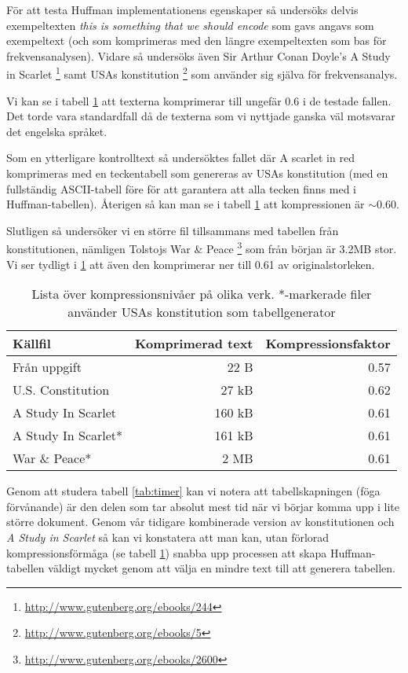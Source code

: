 \documentclass[a4paper, 11pt]{article}
\begin{document}
För att testa Huffman implementationens egenskaper så undersöks delvis exempeltexten \textit{this is something that we should encode} som gavs angavs som exempeltext (och som komprimeras med den längre exempeltexten som bas för frekvensanalysen). Vidare så undersöks även Sir Arthur Conan Doyle's A Study in Scarlet \footnote{\url{http://www.gutenberg.org/ebooks/244}} samt USAs konstitution \footnote{\url{http://www.gutenberg.org/ebooks/5}} som använder sig själva för frekvensanalys. 

Vi kan se i tabell \ref{tab:results} att texterna komprimerar till ungefär 0.6 i de testade fallen. Det torde vara standardfall då de texterna som vi nyttjade ganska väl motsvarar det engelska språket.

Som en ytterligare kontrolltext så undersöktes fallet där A scarlet in red komprimeras med en teckentabell som genereras av USAs konstitution (med en fullständig ASCII-tabell före för att garantera att alla tecken finns med i Huffman-tabellen). Återigen så kan man se i tabell \ref{tab:results} att kompressionen är $\sim$0.60.

Slutligen så undersöker vi en större fil tillsammans med tabellen från konstitutionen, nämligen Tolstojs War \& Peace  \footnote{\url{http://www.gutenberg.org/ebooks/2600}} som från början är 3.2MB stor. Vi ser tydligt i \ref{tab:results} att även den komprimerar ner till 0.61 av originalstorleken.

\begin{table}[h]
\centering
\begin{tabular}{|l|r|r|}  
\hline
Källfil & Komprimerad text & Kompressionsfaktor\\
\hline
Från uppgift & 22 B & 0.57\\
\hline
U.S. Constitution & 27 kB & 0.62\\
\hline
A Study In Scarlet & 160 kB & 0.61\\
\hline
A Study In Scarlet* & 161 kB & 0.61\\
\hline
War \& Peace* & 2 MB & 0.61\\
\hline
\end{tabular}
\caption{Lista över kompressionsnivåer på olika verk. *-markerade filer använder USAs konstitution som tabellgenerator}
\label{tab:results}
\end{table}

Genom att studera tabell \ref{tab:timer} kan vi notera att tabellskapningen (föga förvånande) är den delen som tar absolut mest tid när vi börjar komma upp i lite större dokument. Genom vår tidigare kombinerade version av konstitutionen och \textit{A Study in Scarlet} så kan vi konstatera att man kan, utan förlorad kompressionsförmåga (se tabell \ref{tab:results}) snabba upp processen att skapa Huffman-tabellen väldigt mycket genom att välja en mindre text till att generera tabellen.
\end{document}
